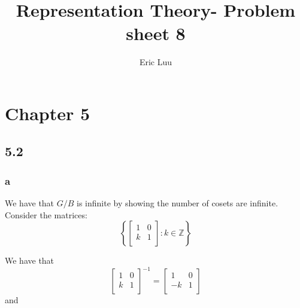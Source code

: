 \documentclass[]{article}
\title{Representation Theory- Problem sheet 8}
\author{Eric Luu}
\begin{document}
\maketitle

\section*{Chapter 5}
\subsection*{5.2}
\subsubsection*{a}
We have that $G/B$ is infinite by showing the number of cosets are infinite. Consider the matrices:
\begin{equation}
	\left\{ \begin{bmatrix}
		1 & 0\\
		k & 1\\
	\end{bmatrix} : k \in \mathbb{Z}\right\}
\end{equation}

We have that 
\begin{equation}
	\begin{bmatrix}
		1 & 0\\
		k & 1\\
	\end{bmatrix}^{-1}
	=
	\begin{bmatrix}
		1 & 0\\
		-k & 1\\
	\end{bmatrix}
\end{equation}
and
\end{document}
